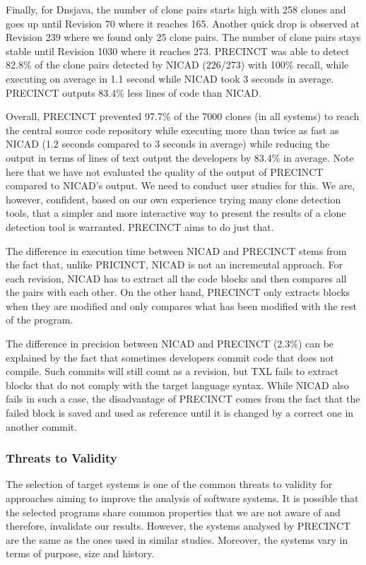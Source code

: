 Finally, for Dnsjava, the number of clone pairs starts high with 258 clones and goes up until Revision 70 where it reaches 165. Another quick drop is observed at Revision 239 where we found only 25 clone pairs. The number of clone pairs stays stable until Revision 1030 where it reaches 273. PRECINCT was able to detect 82.8\% of the clone pairs detected by NICAD (226/273) with 100\% recall, while executing on average in 1.1 second while NICAD took 3 seconds in average. PRECINCT outputs  83.4\% less lines of code than NICAD.

Overall, PRECINCT prevented 97.7\% of the 7000 clones (in all systems) to reach the central source code repository while executing more than twice as fast as NICAD (1.2 seconds compared to 3 seconds in average) while reducing the output in terms of lines of text output the developers by 83.4\% in average. Note here that we have not evaluated the quality of the output of PRECINCT compared to NICAD's output. We need to conduct user studies for this. We are, however, confident, based on our own experience trying many clone detection tools, that a simpler and more interactive way to present the results of a clone detection tool is warranted. PRECINCT aims to do just that.

The difference in execution time between NICAD and PRECINCT stems from the fact that, unlike PRICINCT, NICAD is not an incremental approach. For each revision, NICAD has to extract all the code blocks and then compares all the pairs with each other. On the other hand, PRECINCT only extracts blocks when they are modified and only compares what has been modified with the rest of the program.

The difference in precision between NICAD and PRECINCT (2.3\%)  can be explained by the fact that sometimes developers commit code that does not compile.
Such commits will still count as a revision, but TXL fails to extract blocks that do not comply with the target language syntax.
While NICAD also fails in such a case, the disadvantage of PRECINCT comes from the fact that the failed block is saved and used as reference until it is changed by a correct one in another commit.

\subsubsection{Threats to Validity}
\label{sec:Threats to Validity}

The selection of target systems is one of the common threats to validity for approaches aiming to improve the analysis of software systems.
It is possible that the selected programs share common properties that we are not aware of and therefore, invalidate our results.
However, the systems analysed by PRECINCT are the same as the ones used in similar studies.
Moreover, the systems  vary in terms of purpose, size and history.

